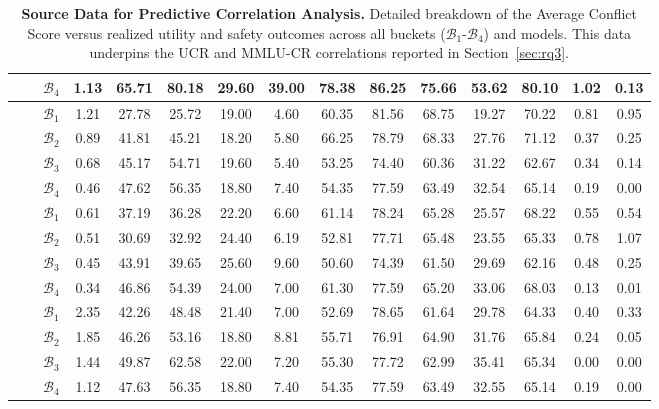 \begin{table}[h!]
{\begin{tabular}{c|l|c|c|cccc|ccc|cc|cc}
 & & $\mathcal{B}_4$ & 1.13 & 65.71 & 80.18 & 29.60 & 39.00 & 78.38 & 86.25 & 75.66 & 53.62 & 80.10 & 1.02 & 0.13 \\ \midrule
 &  
 & $\mathcal{B}_1$ & 1.21 & 27.78 & 25.72 & 19.00 & 4.60 & 60.35 & 81.56 & 68.75 & 19.27 & 70.22 & 0.81 & 0.95 \\
 & & $\mathcal{B}_2$ & 0.89 & 41.81 & 45.21 & 18.20 & 5.80 & 66.25 & 78.79 & 68.33 & 27.76 & 71.12 & 0.37 & 0.25 \\
 & & $\mathcal{B}_3$ & 0.68 & 45.17 & 54.71 & 19.60 & 5.40 & 53.25 & 74.40 & 60.36 & 31.22 & 62.67 & 0.34 & 0.14 \\
 & & $\mathcal{B}_4$ & 0.46 & 47.62 & 56.35 & 18.80 & 7.40 & 54.35 & 77.59 & 63.49 & 32.54 & 65.14 & 0.19 & 0.00 \\ 
 &  
 & $\mathcal{B}_1$ & 0.61 & 37.19 & 36.28 & 22.20 & 6.60 & 61.14 & 78.24 & 65.28 & 25.57 & 68.22 & 0.55 & 0.54 \\
 & & $\mathcal{B}_2$ & 0.51 & 30.69 & 32.92 & 24.40 & 6.19 & 52.81 & 77.71 & 65.48 & 23.55 & 65.33 & 0.78 & 1.07 \\
 & & $\mathcal{B}_3$ & 0.45 & 43.91 & 39.65 & 25.60 & 9.60 & 50.60 & 74.39 & 61.50 & 29.69 & 62.16 & 0.48 & 0.25 \\
 & & $\mathcal{B}_4$ & 0.34 & 46.86 & 54.39 & 24.00 & 7.00 & 61.30 & 77.59 & 65.20 & 33.06 & 68.03 & 0.13 & 0.01 \\ 
 &  
 & $\mathcal{B}_1$ & 2.35 & 42.26 & 48.48 & 21.40 & 7.00 & 52.69 & 78.65 & 61.64 & 29.78 & 64.33 & 0.40 & 0.33 \\
 & & $\mathcal{B}_2$ & 1.85 & 46.26 & 53.16 & 18.80 & 8.81 & 55.71 & 76.91 & 64.90 & 31.76 & 65.84 & 0.24 & 0.05 \\
 & & $\mathcal{B}_3$ & 1.44 & 49.87 & 62.58 & 22.00 & 7.20 & 55.30 & 77.72 & 62.99 & 35.41 & 65.34 & 0.00 & 0.00 \\
 & & $\mathcal{B}_4$ & 1.12 & 47.63 & 56.35 & 18.80 & 7.40 & 54.35 & 77.59 & 63.49 & 32.55 & 65.14 & 0.19 & 0.00 \\ \bottomrule
\end{tabular}
}
\caption{\textbf{Source Data for Predictive Correlation Analysis.} Detailed breakdown of the Average Conflict Score versus realized utility and safety outcomes across all buckets ($\mathcal{B}_1$-$\mathcal{B}_4$) and models. This data underpins the UCR and MMLU-CR correlations reported in Section~\ref{sec:rq3}.}
\label{tab:full_correlation_data}
\end{table}
